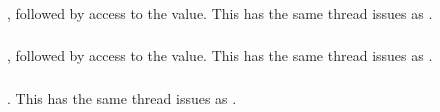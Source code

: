 \documentclass{article}
\begin{document}
\subsubsection{}

\subsubsection{}
\begin{adi3}, followed by access to the value.
This has the same thread issues as .
\end{adi3}

\subsubsection{}
\begin{adi3}, followed by access to the value.
This has the same thread issues as .
\end{adi3}

\subsubsection{}
\begin{adi3}.
This has the same thread issues as .
\end{adi3}

\end{document}
